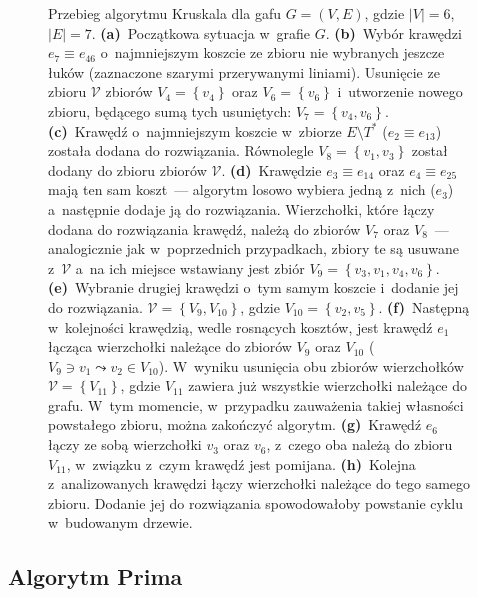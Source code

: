 \begin{figure}[!htbp]
\begin{subfigure}[b]{0.19\textwidth}
		\caption{}
		\label{fig:kruskal:h}
	\end{subfigure}
	\caption{
		Przebieg algorytmu Kruskala dla gafu $G = \left( V, E \right)$, gdzie $\left| V \right| = 6$, $\left| E \right| = 7$.
		\textbf{(a)}~Początkowa sytuacja w~grafie $G$.
		\textbf{(b)}~Wybór krawędzi $e_{7} \equiv e_{46}$ o~najmniejszym koszcie ze zbioru nie wybranych jeszcze łuków (zaznaczone szarymi przerywanymi liniami).
		Usunięcie ze zbioru $\mathcal{V}$ zbiorów $V_{4} = \left\{ v_{4} \right\}$ oraz $V_{6} = \left\{ v_{6} \right\}$ i~utworzenie nowego zbioru, będącego sumą tych usuniętych: $V_{7} = \left\{ v_{4}, v_{6} \right\}$.
		\textbf{(c)}~Krawędź o~najmniejszym koszcie w~zbiorze $E \setminus T^{\ast}$ ($e_{2} \equiv e_{13}$) została dodana do rozwiązania.
		Równolegle $V_{8} = \left\{ v_{1}, v_{3} \right\}$ został dodany do zbioru zbiorów $\mathcal{V}$.
		\textbf{(d)}~Krawędzie $e_{3} \equiv e_{14}$ oraz $e_{4} \equiv e_{25}$ mają ten sam koszt~--- algorytm losowo wybiera jedną z~nich ($e_{3}$) a~następnie dodaje ją do rozwiązania.
		Wierzchołki, które łączy dodana do rozwiązania krawędź, należą do zbiorów $V_{7}$ oraz $V_{8}$~--- analogicznie jak w~poprzednich przypadkach, zbiory te są usuwane z~$\mathcal{V}$ a~na ich miejsce wstawiany jest zbiór $V_{9} = \left\{ v_{3}, v_{1}, v_{4}, v_{6} \right\}$.
		\textbf{(e)}~Wybranie drugiej krawędzi o~tym samym koszcie i~dodanie jej do rozwiązania.
		$\mathcal{V} = \left\{ V_{9}, V_{10} \right\}$, gdzie $V_{10} = \left\{ v_{2}, v_{5} \right\}$.
		\textbf{(f)}~Następną w~kolejności krawędzią, wedle rosnących kosztów, jest krawędź $e_{1}$ łącząca wierzchołki należące do zbiorów $V_{9}$ oraz $V_{10}$ ($V_{9} \ni v_{1} \leadsto v_{2} \in V_{10}$).
		W~wyniku usunięcia obu zbiorów wierzchołków $\mathcal{V} = \left\{ V_{11} \right\}$, gdzie $V_{11}$ zawiera już wszystkie wierzchołki należące do grafu.
		W~tym momencie, w~przypadku zauważenia takiej własności powstałego zbioru, można zakończyć algorytm.
		\textbf{(g)}~Krawędź $e_{6}$ łączy ze sobą wierzchołki $v_{3}$ oraz $v_{6}$, z~czego oba należą do zbioru $V_{11}$, w~związku z~czym krawędź jest pomijana.
		\textbf{(h)}~Kolejna z~analizowanych krawędzi łączy wierzchołki należące do tego samego zbioru.
		Dodanie jej do rozwiązania spowodowałoby powstanie cyklu w~budowanym drzewie.
	}
	\label{fig:kruskal}
\end{figure}



\subsection{Algorytm Prima}



